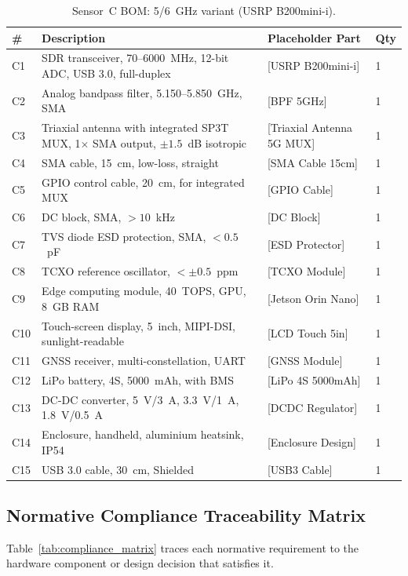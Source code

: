 \documentclass[11pt,a4paper]{article}
\begin{document}
\begin{table}[ht]
\centering
\caption{Sensor~C BOM: 5/6~GHz variant (USRP B200mini-i).}
\label{tab:bom_sensorC}
\small
\begin{tabular}{L{1.0cm} L{5.0cm} L{4.0cm} C{2.0cm}}
\toprule
\textbf{\#} & \textbf{Description} & \textbf{Placeholder Part} & \textbf{Qty} \\
\midrule
C1 & SDR transceiver, 70--6000~MHz, 12-bit ADC, USB 3.0, full-duplex & [USRP B200mini-i] & 1 \\
C2 & Analog bandpass filter, 5.150--5.850~GHz, SMA & [BPF 5GHz] & 1 \\
C3 & Triaxial antenna with integrated SP3T MUX, 1$\times$ SMA output, $\pm 1.5$~dB isotropic & [Triaxial Antenna 5G MUX] & 1 \\
C4 & SMA cable, 15~cm, low-loss, straight & [SMA Cable 15cm] & 1 \\
C5 & GPIO control cable, 20~cm, for integrated MUX & [GPIO Cable] & 1 \\
C6 & DC block, SMA, $> 10$~kHz & [DC Block] & 1 \\
C7 & TVS diode ESD protection, SMA, $< 0.5$~pF & [ESD Protector] & 1 \\
C8 & TCXO reference oscillator, $< \pm 0.5$~ppm & [TCXO Module] & 1 \\
C9 & Edge computing module, 40~TOPS, GPU, 8~GB RAM & [Jetson Orin Nano] & 1 \\
C10 & Touch-screen display, 5~inch, MIPI-DSI, sunlight-readable & [LCD Touch 5in] & 1 \\
C11 & GNSS receiver, multi-constellation, UART & [GNSS Module] & 1 \\
C12 & LiPo battery, 4S, 5000~mAh, with BMS & [LiPo 4S 5000mAh] & 1 \\
C13 & DC-DC converter, 5~V/3~A, 3.3~V/1~A, 1.8~V/0.5~A & [DCDC Regulator] & 1 \\
C14 & Enclosure, handheld, aluminium heatsink, IP54 & [Enclosure Design] & 1 \\
C15 & USB 3.0 cable, 30~cm, Shielded & [USB3 Cable] & 1 \\
\bottomrule
\end{tabular}
\end{table}

\subsection{Normative Compliance Traceability Matrix}

Table~\ref{tab:compliance_matrix} traces each normative requirement to the hardware component or design decision that satisfies it.
\end{document}
